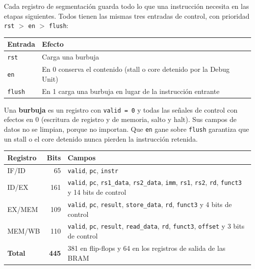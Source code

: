 Cada registro de segmentación guarda todo lo que una instrucción necesita en las etapas
siguientes. Todos tienen las mismas tres entradas de control, con prioridad
\texttt{rst} $>$ \texttt{en} $>$ \texttt{flush}:

\begin{center}
\small
\begin{tabular}{@{}l l@{}}
  \toprule
  \textbf{Entrada} & \textbf{Efecto} \\
  \midrule
  \texttt{rst}   & Carga una burbuja \\
  \texttt{en}    & En 0 conserva el contenido (stall o core detenido por la Debug Unit) \\
  \texttt{flush} & En 1 carga una burbuja en lugar de la instrucción entrante \\
  \bottomrule
\end{tabular}
\end{center}

Una \textbf{burbuja} es un registro con \texttt{valid = 0} y todas las señales de control con
efectos en 0 (escritura de registro y de memoria, salto y halt). Sus campos de datos no se
limpian, porque no importan. Que \texttt{en} gane sobre \texttt{flush} garantiza que un stall o el
core detenido nunca pierden la instrucción retenida.

\begin{center}
\small
\begin{tabular}{@{}l r l@{}}
  \toprule
  \textbf{Registro} & \textbf{Bits} & \textbf{Campos} \\
  \midrule
  IF/ID  &  65 & \texttt{valid}, \texttt{pc}, \texttt{instr} \\
  ID/EX  & 161 & \texttt{valid}, \texttt{pc}, \texttt{rs1\_data}, \texttt{rs2\_data}, \texttt{imm}, \texttt{rs1}, \texttt{rs2}, \texttt{rd}, \texttt{funct3} y 14 bits de control \\
  EX/MEM & 109 & \texttt{valid}, \texttt{pc}, \texttt{result}, \texttt{store\_data}, \texttt{rd}, \texttt{funct3} y 4 bits de control \\
  MEM/WB & 110 & \texttt{valid}, \texttt{pc}, \texttt{result}, \texttt{read\_data}, \texttt{rd}, \texttt{funct3}, \texttt{offset} y 3 bits de control \\
  \midrule
  \textbf{Total} & \textbf{445} & 381 en flip-flops y 64 en los registros de salida de las BRAM \\
  \bottomrule
\end{tabular}
\end{center}

